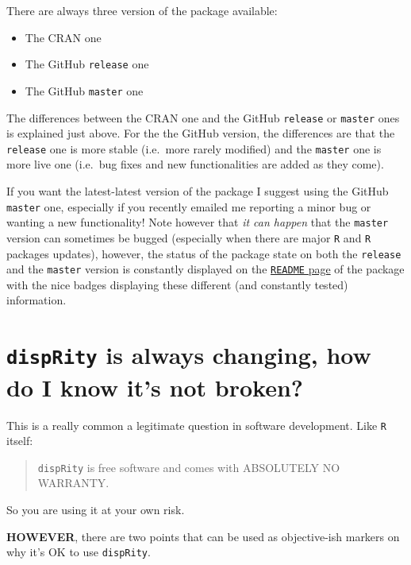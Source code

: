 \documentclass[]{book}
\providecommand{\tightlist}{%
  \setlength{\itemsep}{0pt}\setlength{\parskip}{0pt}}
\begin{document}
There are always three version of the package available:

\begin{itemize}
\tightlist
\item
  The CRAN one
\item
  The GitHub \texttt{release} one
\item
  The GitHub \texttt{master} one
\end{itemize}

The differences between the CRAN one and the GitHub \texttt{release} or \texttt{master} ones is explained just above.
For the the GitHub version, the differences are that the \texttt{release} one is more stable (i.e.~more rarely modified) and the \texttt{master} one is more live one (i.e.~bug fixes and new functionalities are added as they come).

If you want the latest-latest version of the package I suggest using the GitHub \texttt{master} one, especially if you recently emailed me reporting a minor bug or wanting a new functionality!
Note however that \emph{it can happen} that the \texttt{master} version can sometimes be bugged (especially when there are major \texttt{R} and \texttt{R} packages updates), however, the status of the package state on both the \texttt{release} and the \texttt{master} version is constantly displayed on the \href{https://github.com/TGuillerme/dispRity/}{\texttt{README} page} of the package with the nice badges displaying these different (and constantly tested) information.

\hypertarget{disprity-is-always-changing-how-do-i-know-its-not-broken}{%
\section{\texorpdfstring{\texttt{dispRity} is always changing, how do I know it's not broken?}{dispRity is always changing, how do I know it's not broken?}}\label{disprity-is-always-changing-how-do-i-know-its-not-broken}}

This is a really common a legitimate question in software development. Like \texttt{R} itself:

\begin{quote}
\texttt{dispRity} is free software and comes with ABSOLUTELY NO WARRANTY.
\end{quote}

So you are using it at your own risk.

\textbf{HOWEVER}, there are two points that can be used as objective-ish markers on why it's OK to use \texttt{dispRity}.
\end{document}
